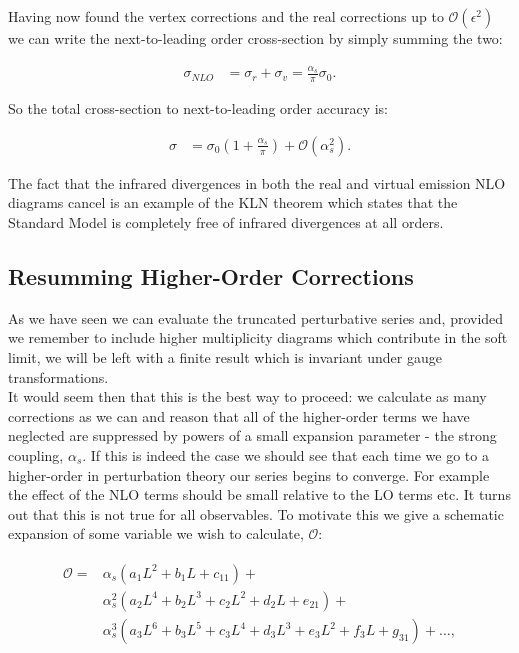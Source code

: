 			Having now found the vertex corrections and the real corrections up to $\mathcal{O}(\epsilon^2)$
			we can write the next-to-leading order cross-section by simply summing the two:

			\begin{align}
				\sigma_{NLO} &= \sigma_r + \sigma_v = \frac{\alpha_s}{\pi}\sigma_0.
			\end{align}

			So the total cross-section to next-to-leading order accuracy is:

			\begin{align}
				\sigma &= \sigma_0\left(1 + \frac{\alpha_s}{\pi}\right) + \mathcal{O}(\alpha_s^2).
			\end{align}


			The fact that the infrared divergences in both the real and virtual emission NLO diagrams cancel is an example of the
			KLN theorem which states that the Standard Model is completely free of infrared divergences at all orders.

	\subsection{Resumming Higher-Order Corrections}

		As we have seen we can evaluate the truncated perturbative series and, provided we remember to include higher
		multiplicity diagrams which contribute in the soft limit, we will be left with a finite result which is invariant
		under gauge transformations.\\ It would seem then that this is the best way to proceed: we calculate as many corrections
		as we can and reason that all of the higher-order terms we have neglected are suppressed by powers of a small expansion
		parameter - the strong coupling, $\alpha_s$.  If this is indeed the case we should see that each time we go to a higher-order
		in perturbation theory our series begins to converge.  For example the effect of the NLO terms should be small relative
		to the LO terms etc.  It turns out that this is not true for all observables.  To motivate this we give a schematic expansion
		of some variable we wish to calculate, $\mathcal{O}$:

		\begin{align}
		\begin{split}
			\mathcal{O} = &\alpha_s  \left(a_1L^2 + b_1L   + c_11\right) + \\
			              &\alpha_s^2\left(a_2L^4 + b_2L^3 + c_2L^2 + d_2L   + e_21\right) + \\
			              &\alpha_s^3\left(a_3L^6 + b_3L^5 + c_3L^4 + d_3L^3 + e_3L^2 + f_3L + g_31\right) + \ldots,
			\label{eqn:schematicExpn}
		\end{split}
		\end{align}

